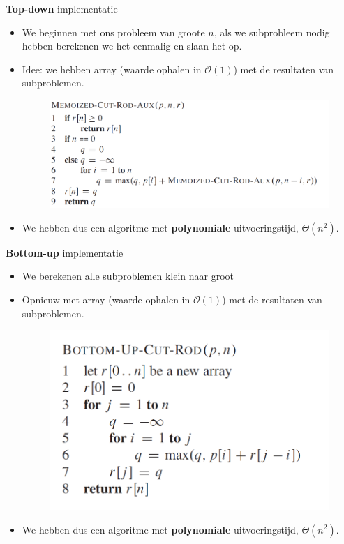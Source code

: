 \documentclass
   [kulak] %
   {kulakbeamer}
\begin{document}
\begin{frame}{\textbf{Top-down} implementatie}
    \begin{itemize}
        \item<1-> We beginnen met ons probleem van groote $n$, als we subprobleem nodig hebben berekenen we het eenmalig en slaan het op.
        \item<2-> Idee: we hebben array (waarde ophalen in $\mathcal{O}(1)$) met de resultaten van subproblemen.
        \begin{figure}
            \centering
            \includegraphics[width=0.75\linewidth]{topdownrodcut.png}
        \end{figure}
        \item<3-> We hebben dus een algoritme met \textbf{polynomiale} uitvoeringstijd, $\Theta(n^2)$.
    \end{itemize}
\end{frame}

\begin{frame}{\textbf{Bottom-up} implementatie}
    \begin{itemize}
        \item<1-> We berekenen alle subproblemen klein naar groot
        \item<2-> Opnieuw met array (waarde ophalen in $\mathcal{O}(1)$) met de resultaten van subproblemen.
        \begin{figure}
            \centering
            \includegraphics[width=0.5\linewidth]{bottomuprodcut.png}
        \end{figure}
        \item<3-> We hebben dus een algoritme met \textbf{polynomiale} uitvoeringstijd, $\Theta(n^2)$.
    \end{itemize}
\end{frame}
\end{document}
